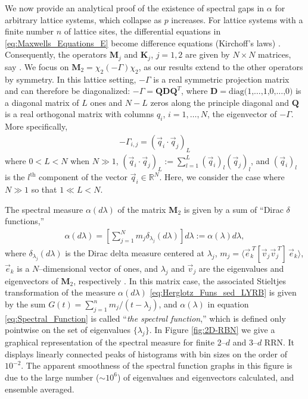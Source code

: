 \documentclass[english,12pt,jmp,graphicx]{revtex4-1}
\begin{document}
We now provide an analytical proof of the existence of spectral gaps
in $\alpha$ for arbitrary lattice systems, which collapse as $p$ increases.
For lattice systems with a finite number $n$ of lattice sites, the
differential equations in \eqref{eq:Maxwells_Equations_E} become
difference equations (Kirchoff's laws)
\cite{Golden:JMP-5627}. Consequently, the operators 
$\mathbf{M}_j$ and $\mathbf{K}_j$, $j=1,2$ are given by $N\times N$
matrices, say \cite{Golden:JoB:337,Golden:JMP-5627}. We focus on 
$\mathbf{M}_2=\chi_2(-\Gamma)\chi_2$, as our results extend to the other operators
by symmetry. In this lattice setting, $-\Gamma$ is a real symmetric projection
matrix and can therefore be diagonalized:
$-\Gamma=\mathbf{Q}\mathbf{D}\mathbf{Q}^T$, where 
$\mathbf{D}=\text{diag(1,\ldots,1,0,\ldots,0)}$ is a diagonal matrix of $L$ ones
and $N-L$ zeros along the principle diagonal and $\mathbf{Q}$
is a real orthogonal matrix with columns $q_i$, $i=1,\ldots,N$, the
eigenvector of $-\Gamma$. More specifically, 
\begin{align*}
  -\Gamma_{i,j}=(\vec{q}_i\cdot\vec{q}_j)_L
\end{align*}
%
where $0<L<N$ when $N\gg1$,
$(\vec{q}_i\cdot\vec{q}_j)_L:=\sum_{l=1}^L(\vec{q}_i)_l(\vec{q}_j)_l$, and
$(\vec{q}_i)_l$ is the $l^{\text{th}}$ component of the vector
$\vec{q}_i\in\mathbb{R}^N$. Here, we consider the case where $N\gg1$ so
that $1\ll L<N$.   

The spectral measure $\alpha(d\lambda)$ of the matrix $\mathbf{M}_2$ is given by
a sum of ``Dirac $\delta$ functions,''
%
\begin{align}\label{eq:Spectral_Function}
  \alpha(d\lambda)=
    \left[\sum_{j=1}^N m_j \delta_{\lambda_j}(d\lambda)\right]d\lambda
      :=\alpha(\lambda)d\lambda,
\end{align}
%
where $\delta_{\lambda_j}(d\lambda)$ is the Dirac delta measure centered at $\lambda_j$,
$m_j=\langle\vec{e}_k^{\;T}[\vec{v}_j\vec{v}_j^{\;T}]\,\vec{e}_k\rangle$, 
$\vec{e}_k$ is a $N$--dimensional vector of ones, and $\lambda_j$ and
$\vec{v}_j$ are the eigenvalues and eigenvectors of $\mathbf{M}_2$,
respectively \cite{Golden:JoB:337}. In this matrix case, the associated Stieltjes
transformation of the measure $\alpha(d\lambda)$ \eqref{eq:Herglotz_Funs_sed_LYRB} is
given by the sum $G(t)=\sum_{j=1}^nm_j/(t-\lambda_j)$, and $\alpha(\lambda)$ in equation
\eqref{eq:Spectral_Function} is called ``\emph{the spectral
  function},'' which is defined only pointwise on the set of
eigenvalues $\{\lambda_j\}$. In Figure \ref{fig:2D-RBN} we give a graphical
representation of the spectral measure for finite 2--$d$ and 3--$d$
RRN. It displays linearly connected peaks of histograms with bin
sizes on the order of $10^{-2}$. The apparent smoothness of the
spectral function graphs in this figure is due to the large number
($\sim10^6$) of eigenvalues and eigenvectors calculated, and ensemble
averaged. 
\end{document}
